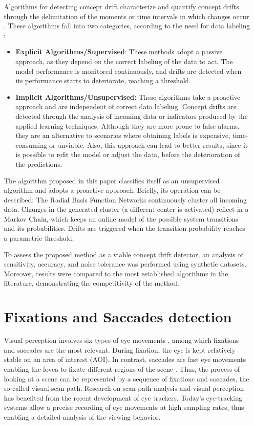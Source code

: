 \documentclass[preprint,12pt]{elsarticle}
\begin{document}
Algorithms for detecting concept drift characterize and quantify concept drifts through the delimitation of the moments or time intervals in which changes occur \cite{Basseville:1993:DAC:151741}.
%
These algorithms fall into two categories, according to the need for data labeling \cite{Zliobaite:2010}:

\begin{itemize}
    \item \textbf{Explicit Algorithms/Supervised}: These methods adopt a passive approach, as they depend on the correct labeling of the data to act. The model performance is monitored continuously, and drifts are detected when its performance starts to deteriorate, reaching a threshold.
    \item \textbf{Implicit Algorithms/Unsupervised:} These algorithms take a proactive approach and are independent of correct data labeling. Concept drifts are detected through the analysis of incoming data or indicators produced by the applied learning techniques. Although they are more prone to false alarms, they are an alternative to scenarios where obtaining labels is expensive, time-consuming or unviable. Also, this approach can lead to better results, since it is possible to refit the model or adjust the data, before the deterioration of the predictions.
\end{itemize}

The algorithm proposed in this paper classifies itself as an unsupervised algorithm and adopts a proactive approach.
Briefly, its operation can be described: The Radial Basis Function Networks continuously cluster all incoming data.
Changes in the generated cluster (a different center is activated) reflect in a Markov Chain, which keeps an online model of the possible system transitions and its probabilities. Drifts are triggered when the transition probability reaches a parametric threshold.

To assess the proposed method as a viable concept drift detector, an analysis of sensitivity, accuracy, and noise tolerance was performed using synthetic datasets. Moreover, results were compared to the most established algorithms in the literature, demonstrating the competitivity of the method.

\section{Fixations and Saccades detection}
\label{sec:eye_tracking}

Visual perception involves six types of eye movements \cite{leigh2015neurology}, among which fixations and saccades are the most relevant.
During fixation, the eye is kept relatively stable on an area of interest (AOI). In contrast, saccades are fast eye movements enabling the fovea to fixate different regions of the scene \cite{privitera:2005:scanpath_theory}.
Thus, the process of looking at a scene can be represented by a sequence of fixations and saccades, the so-called visual scan path.
Research on scan path analysis and visual perception has benefited from the recent development of eye trackers.
Today’s eye-tracking systems allow a precise recording of eye movements at high sampling rates, thus enabling a detailed analysis of the viewing behavior.
\end{document}
